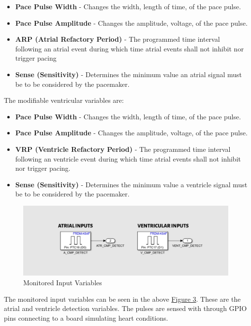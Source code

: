 \documentclass{article}
\newcounter{subsubsubsection}[subsubsection]
\begin{document}
\begin{itemize}
    \item \textbf{Pace Pulse Width} - Changes the width, length of time, of the pace pulse.
    \item \textbf{Pace Pulse Amplitude} - Changes the amplitude, voltage, of the pace pulse.
    \item \textbf{ARP (Atrial Refactory Period)} - The programmed time interval following an atrial event during which time atrial
            events shall not inhibit nor trigger pacing
    \item \textbf{Sense (Sensitivity)} - Determines the minimum value an atrial signal must be to be considered by the pacemaker. 
\end{itemize}
The modifiable ventricular variables are:

\begin{itemize}
    \item \textbf{Pace Pulse Width} - Changes the width, length of time, of the pace pulse.
    \item \textbf{Pace Pulse Amplitude} - Changes the amplitude, voltage, of the pace pulse.
    \item \textbf{VRP (Ventricle Refactory Period)} - The programmed time interval following an ventricle event during which time atrial
            events shall not inhibit nor trigger pacing.
    \item \textbf{Sense (Sensitivity)} - Determines the minimum value a ventricle signal must be to be considered by the pacemaker.
\end{itemize}

\newpage
{}

\begin{tcolorbox}
    \begin{figure}[H]\label{InMon}
        \includegraphics[width=\textwidth]{InMon.png}
        \caption{Monitored Input Variables}     
    \end{figure}
\end{tcolorbox}
The monitored input variables can be seen in the above \hyperref[InMon]{Figure 3}. These are the atrial and ventricle detection 
variables. The pulses are sensed with through GPIO pins connecting to a board simulating heart conditions. 
\end{document}
